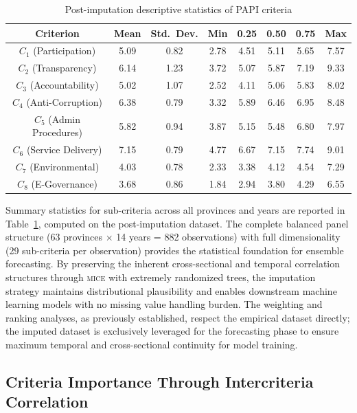 \documentclass[12pt,a4paper]{article}
\newcommand{\MICE}{\textsc{mice}\xspace}
\begin{document}
\begin{table}[!ht]
\centering
\caption{Post-imputation descriptive statistics of PAPI criteria}
\label{tab:descriptive}
\small
\begin{tabular}{c c c c c c c c}
\toprule
\textbf{Criterion} & \textbf{Mean} & \textbf{Std.\ Dev.} & \textbf{Min} & \textbf{0.25} & \textbf{0.50} & \textbf{0.75} & \textbf{Max} \\
\midrule
$C_1$ (Participation) & 5.09 & 0.82 & 2.78 & 4.51 & 5.11 & 5.65 & 7.57 \\
$C_2$ (Transparency) & 6.14 & 1.23 & 3.72 & 5.07 & 5.87 & 7.19 & 9.33 \\
$C_3$ (Accountability) & 5.02 & 1.07 & 2.52 & 4.11 & 5.06 & 5.83 & 8.02 \\
$C_4$ (Anti-Corruption) & 6.38 & 0.79 & 3.32 & 5.89 & 6.46 & 6.95 & 8.48 \\
$C_5$ (Admin Procedures) & 5.82 & 0.94 & 3.87 & 5.15 & 5.48 & 6.80 & 7.97 \\
$C_6$ (Service Delivery) & 7.15 & 0.79 & 4.77 & 6.67 & 7.15 & 7.74 & 9.01 \\
$C_7$ (Environmental) & 4.03 & 0.78 & 2.33 & 3.38 & 4.12 & 4.54 & 7.29 \\
$C_8$ (E-Governance) & 3.68 & 0.86 & 1.84 & 2.94 & 3.80 & 4.29 & 6.55 \\
\bottomrule
\end{tabular}
\end{table}

Summary statistics for sub-criteria across all provinces and years are reported in Table~\ref{tab:descriptive}, computed on the post-imputation dataset. The complete balanced panel structure (63 provinces $\times$ 14 years = 882 observations) with full dimensionality (29 sub-criteria per observation) provides the statistical foundation for ensemble forecasting. By preserving the inherent cross-sectional and temporal correlation structures through \MICE with extremely randomized trees, the imputation strategy maintains distributional plausibility and enables downstream machine learning models with no missing value handling burden. The weighting and ranking analyses, as previously established, respect the empirical dataset directly; the imputed dataset is exclusively leveraged for the forecasting phase to ensure maximum temporal and cross-sectional continuity for model training.

\subsection{Criteria Importance Through Intercriteria Correlation}
\label{subsec:critic}
\end{document}
